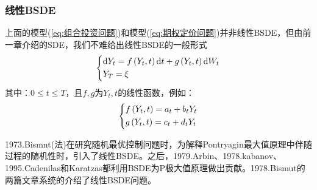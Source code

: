 		\subsubsection{线性BSDE}
			上面的模型(\ref{eq:组合投资问题})和模型(\ref{eq:期权定价问题})并非线性BSDE，但由前一章介绍的SDE，我们不难给出线性BSDE的一般形式
			\begin{equation*}
				\centering
				\left\{\begin{lgathered}
				{\mathrm{d}{Y_t} = f\left( {{Y_t},t} \right)\mathrm{d}t + g\left( {{Y_t},t} \right)\mathrm{d}{W_t}}\\
				{{Y_T} = \xi }
				\end{lgathered} \right.
			\end{equation*}
			其中：${0 \leqslant t \leqslant T}$，且$f,g$为${Y_t},t$的线性函数，例如：
			\begin{equation*}
				\centering
				\left\{\begin{lgathered}
				{f\left( {{Y_t},t} \right) = {a_t} + {b_t}{Y_t}}\\
				{g\left( {{Y_t},t} \right) = {c_t} + {d_t}{Y_t}}
				\end{lgathered} \right.
			\end{equation*}
			\par
			1973.Bismnt(法)\cite{1973.Bismnt}在研究随机最优控制问题时，为解释Pontryagin最大值原理中伴随过程的随机性时，引入了线性BSDE。之后，1979.Arbin、1978.kabanov、1995.Cadenilas和Karatzas都利用BSDE为P极大值原理做出贡献。1978.Bismut的两篇文章\cite{1978.Bismut2}\cite{1978.Bismut1}系统的介绍了线性BSDE问题。
